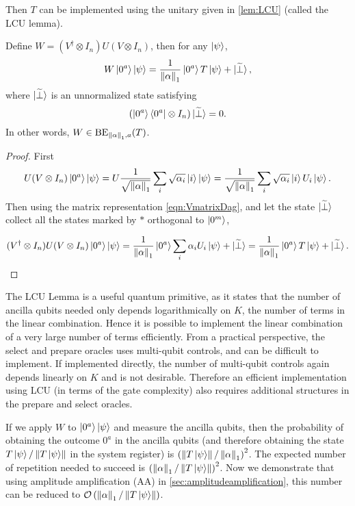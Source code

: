Then $T$ can be implemented using the unitary given in \cref{lem:LCU} (called the LCU lemma).
\begin{lem}[LCU]
\label{lem:LCU}
Define
\(W=(V^{\dagger}\otimes I_n) U(V\otimes I_n)\), then for any
\(\ket{\psi}\),
\begin{equation}W\ket{0^a}\ket{\psi}=\frac{1}{\left\lVert\alpha\right\rVert_1}\ket{0^a} T \ket{\psi} + \ket{\widetilde{\perp}},\end{equation}
where $\ket{\widetilde{\perp}}$ is an unnormalized state satisfying
\begin{equation}(\ket{0^a}\bra{0^a}\otimes I_n)\ket{\widetilde{\perp}}=0.\end{equation}
In other words, $W\in\operatorname{BE}_{\left\lVert\alpha\right\rVert_1,a}(T)$.
\end{lem}

\begin{proof}

First
\begin{equation}
U(V\otimes I_n)\ket{0^a}\ket{\psi}=U\frac{1}{\sqrt{\left\lVert\alpha\right\rVert_1}}\sum_i \sqrt{\alpha_i}\ket{i}\ket{\psi}=\frac{1}{\sqrt{\left\lVert\alpha\right\rVert_1}}\sum_i \sqrt{\alpha_i}\ket{i} U_i\ket{\psi}.
\end{equation}
Then using the matrix representation \eqref{eqn:VmatrixDag}, and let
the state \(\ket{\widetilde{\perp}}\) collect all the states marked by \(*\) orthogonal to \(\ket{0^m}\),

\begin{equation}(V^{\dagger}\otimes I_n) U(V\otimes I_n)\ket{0^a}\ket{\psi}=\frac{1}{\left\lVert\alpha\right\rVert_1}\ket{0^a}\sum_i \alpha_i U_i\ket{\psi} + \ket{\widetilde{\perp}} = \frac{1}{\left\lVert\alpha\right\rVert_1}\ket{0^a} T \ket{\psi} + \ket{\widetilde{\perp}}.\end{equation}
\end{proof}

The LCU Lemma is a useful quantum primitive, as it states that the number of ancilla qubits needed only depends logarithmically on $K$, the number of terms in the linear combination. 
Hence it is possible to implement the linear combination of a very large number of terms efficiently.
From a practical perspective, the select and prepare oracles uses multi-qubit controls, and can be difficult to implement. If implemented directly, the number of multi-qubit controls again depends linearly on $K$ and is not desirable. Therefore an efficient implementation using LCU (in terms of the gate complexity) also requires additional structures in the prepare and select oracles.

If we apply \(W\) to \(\ket{0^a}\ket{\psi}\) and measure the ancilla qubits, then the probability of obtaining the outcome \(0^a\) in the ancilla qubits (and therefore obtaining the state 
\(T\ket{\psi}/\left\lVert T\ket{\psi}\right\rVert\) in the system register) is
\(\left(\left\lVert T\ket{\psi}\right\rVert/\left\lVert\alpha\right\rVert_1\right)^2\). The expected
number of repetition needed to succeed is
\(\left(\left\lVert\alpha\right\rVert_1/\left\lVert T\ket{\psi}\right\rVert\right)^2\). Now we
demonstrate that using amplitude amplification
(AA) in \cref{sec:amplitudeamplification}, this number can be reduced to \(\mathcal{O}\left(\left\lVert\alpha\right\rVert_1/\left\lVert T\ket{\psi}\right\rVert\right)\).

